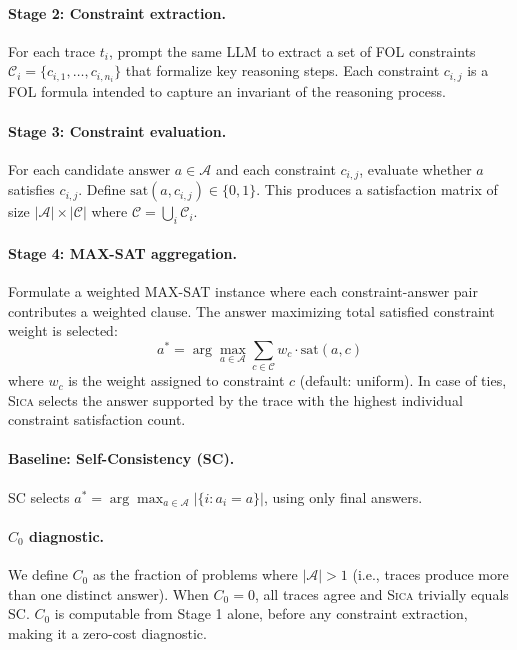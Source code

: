 \documentclass[11pt,a4paper]{article}
\newcommand{\sica}{\textsc{Sica}}
\begin{document}
\paragraph{Stage 2: Constraint extraction.}
For each trace $t_i$, prompt the same LLM to extract a set of FOL constraints $\mathcal{C}_i = \{c_{i,1}, \ldots, c_{i,n_i}\}$ that formalize key reasoning steps.
Each constraint $c_{i,j}$ is a FOL formula intended to capture an invariant of the reasoning process.

\paragraph{Stage 3: Constraint evaluation.}
For each candidate answer $a \in \mathcal{A}$ and each constraint $c_{i,j}$, evaluate whether $a$ satisfies $c_{i,j}$.
Define $\text{sat}(a, c_{i,j}) \in \{0, 1\}$.
This produces a satisfaction matrix of size $|\mathcal{A}| \times |\mathcal{C}|$ where $\mathcal{C} = \bigcup_i \mathcal{C}_i$.

\paragraph{Stage 4: MAX-SAT aggregation.}
Formulate a weighted MAX-SAT instance where each constraint-answer pair contributes a weighted clause.
The answer maximizing total satisfied constraint weight is selected:
\begin{equation}
    a^* = \arg\max_{a \in \mathcal{A}} \sum_{c \in \mathcal{C}} w_c \cdot \text{sat}(a, c)
\end{equation}
where $w_c$ is the weight assigned to constraint $c$ (default: uniform).
In case of ties, \sica{} selects the answer supported by the trace with the highest individual constraint satisfaction count.

\paragraph{Baseline: Self-Consistency (SC).}
SC selects $a^* = \arg\max_{a \in \mathcal{A}} |\{i : a_i = a\}|$, using only final answers.

\paragraph{$C_0$ diagnostic.}
We define $C_0$ as the fraction of problems where $|\mathcal{A}| > 1$ (i.e., traces produce more than one distinct answer).
When $C_0 = 0$, all traces agree and \sica{} trivially equals SC.
$C_0$ is computable from Stage 1 alone, before any constraint extraction, making it a zero-cost diagnostic.
\end{document}
